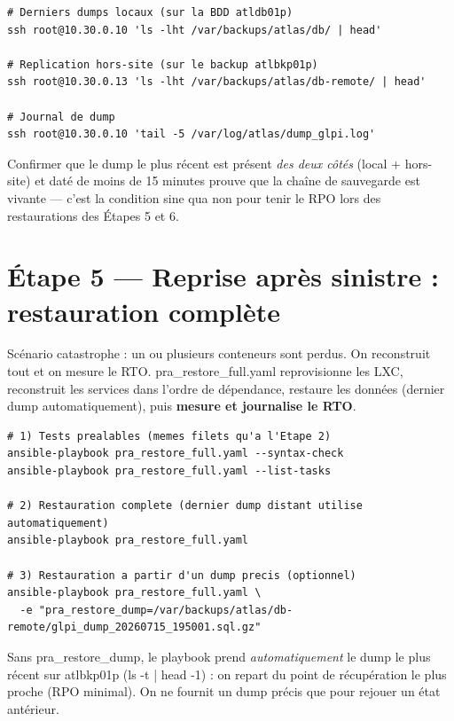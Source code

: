 \documentclass[11pt,a4paper]{article}
\newcommand{\cmd}[1]{{\ttfamily #1}}
\begin{document}
\begin{lstlisting}[style=bash]
# Derniers dumps locaux (sur la BDD atldb01p)
ssh root@10.30.0.10 'ls -lht /var/backups/atlas/db/ | head'

# Replication hors-site (sur le backup atlbkp01p)
ssh root@10.30.0.13 'ls -lht /var/backups/atlas/db-remote/ | head'

# Journal de dump
ssh root@10.30.0.10 'tail -5 /var/log/atlas/dump_glpi.log'
\end{lstlisting}

\begin{pourquoi}
Confirmer que le dump le plus récent est présent \emph{des deux côtés} (local + hors-site)
et daté de moins de 15 minutes prouve que la chaîne de sauvegarde est vivante — c'est la
condition sine qua non pour tenir le RPO lors des restaurations des Étapes 5 et 6.
\end{pourquoi}

\section{Étape 5 — Reprise après sinistre : restauration complète}
\begin{etape}{Scénario catastrophe : un ou plusieurs conteneurs sont perdus. On reconstruit
tout et on mesure le RTO.}
\cmd{pra_restore_full.yaml} reprovisionne les LXC, reconstruit les services dans l'ordre de
dépendance, restaure les données (dernier dump automatiquement), puis \textbf{mesure et
journalise le RTO}.
\end{etape}

\begin{lstlisting}[style=bash]
# 1) Tests prealables (memes filets qu'a l'Etape 2)
ansible-playbook pra_restore_full.yaml --syntax-check
ansible-playbook pra_restore_full.yaml --list-tasks

# 2) Restauration complete (dernier dump distant utilise automatiquement)
ansible-playbook pra_restore_full.yaml

# 3) Restauration a partir d'un dump precis (optionnel)
ansible-playbook pra_restore_full.yaml \
  -e "pra_restore_dump=/var/backups/atlas/db-remote/glpi_dump_20260715_195001.sql.gz"
\end{lstlisting}

\begin{pourquoi}
Sans \cmd{pra_restore_dump}, le playbook prend \emph{automatiquement} le dump le plus
récent sur \cmd{atlbkp01p} (\cmd{ls -t | head -1}) : on repart du point de récupération le
plus proche (RPO minimal). On ne fournit un dump précis que pour rejouer un état antérieur.
\end{pourquoi}
\end{document}
